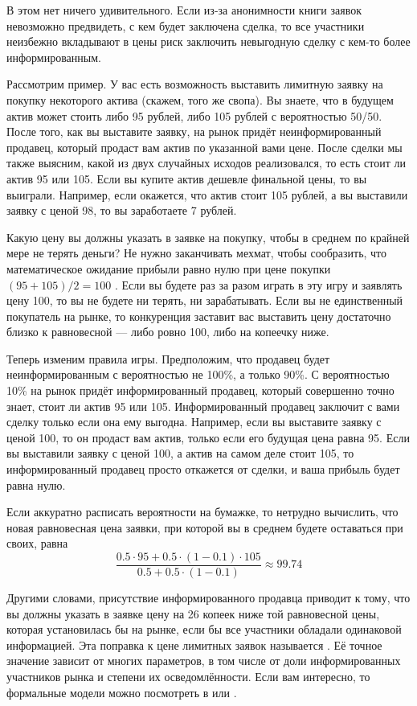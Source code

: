 В этом нет ничего удивительного. Если из-за анонимности книги заявок невозможно
предвидеть, с кем будет заключена сделка, то все участники неизбежно вкладывают
в цены риск заключить невыгодную сделку с кем-то более информированным. 

Рассмотрим пример. У вас есть возможность выставить лимитную заявку на покупку некоторого
актива (скажем, того же свопа). Вы знаете, что в будущем актив может стоить
либо 95 рублей, либо 105 рублей с вероятностью 50/50. После того, как вы
выставите заявку, на рынок придёт неинформированный продавец, который продаст
вам актив по указанной вами цене. После сделки мы также выясним, какой из двух
случайных исходов реализовался, то есть стоит ли актив 95 или 105. Если вы купите
актив дешевле финальной цены, то вы выиграли. Например, если окажется, что актив
стоит 105 рублей, а вы выставили заявку с ценой 98, то вы заработаете 7 рублей.

Какую цену вы должны указать в заявке на покупку, чтобы в среднем по крайней
мере не терять деньги? Не нужно заканчивать мехмат, чтобы сообразить, что
математическое ожидание прибыли равно нулю при цене покупки $(95+105)/2 = 100$ .
Если вы будете раз за разом играть в эту игру и заявлять цену 100, то вы не будете ни
терять, ни зарабатывать. Если вы не единственный покупатель на рынке, то конкуренция
заставит вас выставить цену достаточно близко к равновесной --- либо ровно 100, либо
на копеечку ниже.

Теперь изменим правила игры. Предположим, что продавец будет неинформированным
с вероятностью не 100\%, а только 90\%. С вероятностью 10\% на рынок придёт 
информированный продавец, который совершенно точно знает, стоит ли актив 95 или
105. Информированный продавец заключит с вами сделку только если она ему выгодна.
Например, если вы выставите заявку с ценой 100, то он продаст вам актив, только если 
его будущая цена равна 95. Если вы выставили заявку с ценой 100, а актив на самом деле
стоит 105, то информированный продавец просто откажется от сделки, и ваша прибыль
будет равна нулю.

Если аккуратно расписать вероятности на бумажке, то нетрудно вычислить, что новая 
равновесная цена заявки, при которой вы в среднем будете оставаться при своих, равна 
$$\frac{0.5\cdot95 + 0.5\cdot(1-0.1)\cdot105}{0.5 + 0.5\cdot(1-0.1)} \approx 99.74$$

Другими словами, присутствие информированного продавца приводит к тому,
что вы должны указать в заявке цену на 26 копеек ниже той равновесной цены,
которая установилась бы на рынке, если бы все участники обладали одинаковой
информацией. Эта поправка к цене лимитных заявок называется . Её точное значение зависит от многих
параметров, в том числе от доли информированных участников рынка и степени их
осведомлённости. Если вам интересно, то формальные модели можно посмотреть в
\cite[ch. 11]{hasbrouck2017securities} или \cite[ch. 6]{foucault2013market}.

